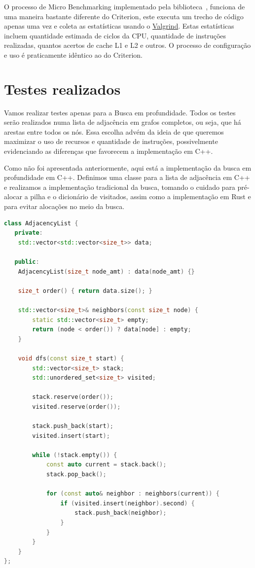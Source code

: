 O processo de Micro Benchmarking implementado pela
biblioteca~\cite{gungraunrust}, funciona de uma maneira bastante
diferente do Criterion, este executa um trecho de código apenas uma
vez e coleta as estatísticas usando o
\href{https://valgrind.org/}{Valgrind}. Estas estatísticas incluem
quantidade estimada de ciclos da CPU, quantidade de instruções
realizadas, quantos acertos de cache L1 e L2 e outros. O processo de
configuração e uso é praticamente idêntico ao do Criterion.

\section{Testes realizados}

Vamos realizar testes apenas para a Busca em
profundidade. Todos os testes serão realizados numa lista de
adjacência em grafos completos, ou seja, que há arestas entre todos
os nós. Essa escolha advém da ideia de que queremos maximizar o uso
de recursos e quantidade de instruções, possivelmente evidenciando
as diferenças que favorecem a implementação em C++.

Como não foi apresentada anteriormente, aqui está a implementação da
busca em profundidade em C++. Definimos uma classe para a lista de
adjacência em C++ e realizamos a implementação tradicional da busca,
tomando o cuidado para pré-alocar a pilha e o dicionário de
visitados, assim como a implementação em Rust e para evitar alocações
no meio da busca.

\begin{lstlisting}[language=C++, caption={Implementação da busca em profundidade em C++}]
class AdjacencyList {
   private:
    std::vector<std::vector<size_t>> data;

   public:
    AdjacencyList(size_t node_amt) : data(node_amt) {}

    size_t order() { return data.size(); }

    std::vector<size_t>& neighbors(const size_t node) {
        static std::vector<size_t> empty;
        return (node < order()) ? data[node] : empty;
    }

    void dfs(const size_t start) {
        std::vector<size_t> stack;
        std::unordered_set<size_t> visited;

        stack.reserve(order());
        visited.reserve(order());

        stack.push_back(start);
        visited.insert(start);

        while (!stack.empty()) {
            const auto current = stack.back();
            stack.pop_back();

            for (const auto& neighbor : neighbors(current)) {
                if (visited.insert(neighbor).second) {
                    stack.push_back(neighbor);
                }
            }
        }
    }
};
\end{lstlisting}

